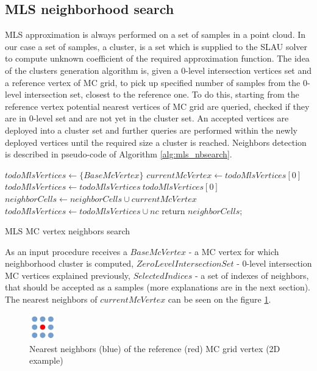 \subsection{MLS neighborhood search}
MLS approximation is always performed on a set of samples in a point cloud. In our case a set of samples, a cluster, is a set which is supplied to the SLAU solver to compute unknown coefficient of the required approximation function. The idea of the clusters generation algorithm is, given a 0-level intersection vertices set and a reference vertex of MC grid, to pick up specified number of samples from the 0-level intersection set, closest to the reference one. To do this, starting from the reference vertex potential nearest vertices of MC grid are queried, checked if they are in 0-level set and are not yet in the cluster set. An accepted vertices are deployed into a cluster set and further queries are performed within the newly deployed vertices until the required size a cluster is reached.
Neighbors detection is described in pseudo-code of Algorithm \ref{alg:mls_nbsearch}.
\begin{algorithm}[H]
	\scriptsize
	\begin{algorithmic}
		\State $todoMlsVertices \gets \{ BaseMcVertex \}$
			\State $currentMcVertex \gets todoMlsVertices[0]$
			\State $todoMlsVertices \gets todoMlsVertices \ todoMlsVertices[0]$
				\State $neighborCells \gets neighborCells \cup currentMcVertex$ 
			\EndIf
					\State $todoMlsVertices \gets todoMlsVertices \cup nc$
				\EndIf
			\EndFor
		\EndWhile
		\State return $neighborCells$;
	\end{algorithmic}
	\caption{MLS MC vertex neighbors search}
	\label{alg:mls_nbsearch}
\end{algorithm}
As an input procedure receives a $BaseMcVertex$ - a MC vertex for which neighborhood cluster is computed, $ZeroLevelIntersectionSet$ - 0-level intersection MC vertices explained previously, $SelectedIndices$ - a set of indexes of neighbors, that should be accepted as a samples (more explanations are in the next section). The nearest neighbors of $currentMcVertex$ can be seen on the figure \ref{fig:MCgridNearestNeighbors}.\\
\begin{figure}[H]
	\begin{center}
		\includegraphics[width=0.1\textwidth]{figures/nearestNeighbors.png}
	\end{center}
	\caption{Nearest neighbors (blue) of the reference (red) MC grid vertex (2D example) } \label{fig:MCgridNearestNeighbors}
\end{figure}

